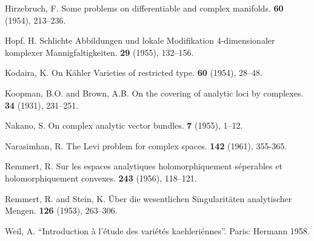 \documentclass{article}
\theoremstyle{plain}
\theoremstyle{definition}
\begin{document}
\begin{thebibliography}{20}
  {\sc Hirzebruch, F.}
  \newblock Some problems on differentiable and complex manifolds.
   {\bf 60} (1954), 213--236.

  {\sc Hopf, H.}
  \newblock Schlichte Abbildungen und lokale Modifikation 4-dimensionaler komplexer Mannigfaltigkeiten.
   {\bf 29} (1955), 132--156.

  {\sc Kodaira, K.}
  \newblock On K\"{a}hler Varieties of restricted type.
   {\bf 60} (1954), 28--48.

  {\sc Koopman, B.O. and Brown, A.B.}
  \newblock On the covering of analytic loci by complexes.
   {\bf 34} (1931), 231--251.

  {\sc Nakano, S.}
  \newblock On complex analytic vector bundles.
   {\bf 7} (1955), 1--12.

  {\sc Narasimhan, R.}
  \newblock The Levi problem for complex spaces.
   {\bf 142} (1961), 355-365.

  {\sc Remmert, R.}
  \newblock Sur les espaces analytiques holomorphiquement s\'{e}perables et holomorphiquement convexes.
   {\bf 243} (1956), 118--121.

  {\sc Remmert, R. and Stein, K.}
  \newblock \"{U}ber die wesentlichen Singularit\"{a}ten analytischer Mengen.
   {\bf 126} (1953), 263--306.

  {\sc Weil, A.}
  \newblock ``Introduction \`{a} l'\'{e}tude des vari\'{e}t\'{e}s kaehleri\'{e}nnes''.
  \newblock Paris: Hermann 1958.

\end{thebibliography}
\end{document}

